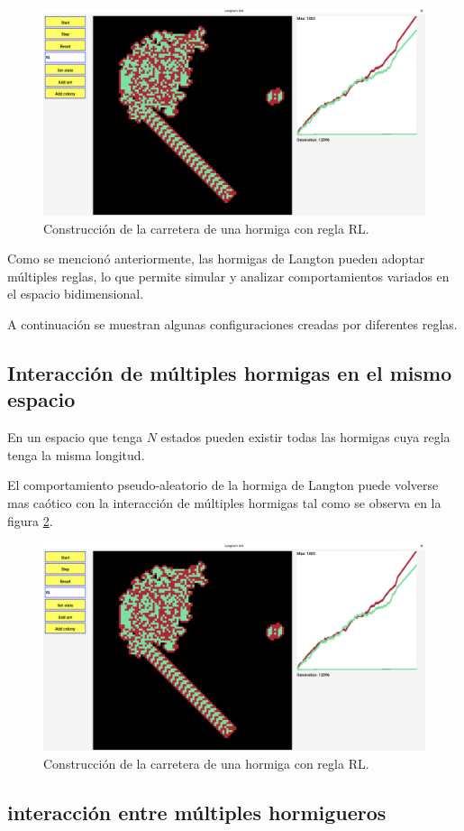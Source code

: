 \documentclass[12pt,twoside]{article}
\begin{document}
\begin{figure}[H]
	\centering
	\includegraphics[width=\textwidth]{img/rl2.png}
	\caption{Construcción de la carretera de una hormiga con regla RL.}
	\label{img:rl2}
\end{figure}

Como se mencionó anteriormente, las hormigas de Langton pueden adoptar múltiples reglas, lo que permite simular y analizar comportamientos variados en el espacio bidimensional.

A continuación se muestran algunas configuraciones creadas por diferentes reglas.



\subsection{Interacción de múltiples hormigas en el mismo espacio}

En un espacio que tenga $N$ estados pueden existir todas las hormigas cuya regla tenga la misma longitud.

El comportamiento pseudo-aleatorio de la hormiga de Langton puede volverse mas caótico con la interacción de múltiples hormigas tal como se observa en la figura \ref{img:mul1}. 

\begin{figure}[H]
	\centering
	\includegraphics[width=\textwidth]{img/rl2.png}
	\caption{Construcción de la carretera de una hormiga con regla RL.}
	\label{img:mul1}
\end{figure}

\subsection{interacción entre múltiples hormigueros}


	\clearpage
	\begin{thebibliography}{99}
		\bibitem{}
		
	\end{thebibliography}
	
\end{document}
